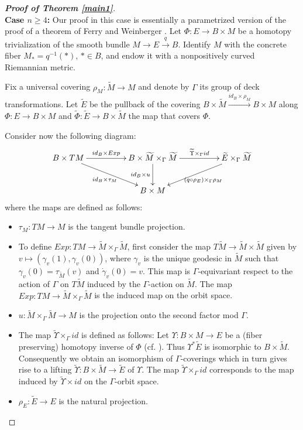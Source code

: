 \documentclass[onecolumn,notitlepage,11pt]{article}
\newcommand{\refer}[1]{\hyperref[#1]{\ref*{#1}}}%
\theoremstyle{definition}
\begin{document}
\begin{proof}[\textbf{Proof of Theorem \refer{main1}}]\ \\
\textbf{Case $n\geq 4$:} Our proof in this case is essentially
a parametrized version of the proof of a theorem of Ferry and Weinberger
\cite[Theorem 2]{FW91}. Let $\Phi:E\to B\times M$ be a homotopy trivialization of the
smooth bundle $M\to E\xrightarrow{q} B$. 
Identify $M$ with the concrete fiber $M_{\ast}=q^{-1}(\ast)$, 
$\ast\in B$, and endow it with a nonpositively curved Riemannian metric.

Fix a universal covering $\rho_M:\widetilde{M}\to M$ and 
denote by $\Gamma$ its
group of deck transformations. Let $\widetilde{E}$ be the pullback
of the covering 
$B\times\widetilde{M}\xrightarrow{id_B\times\rho_M}B\times M$ 
along $\Phi:E\to B\times M$ and 
$\widetilde{\Phi}:\widetilde{E}\to B\times\widetilde{M}$ the map
that covers $\Phi$. 

Consider now the 
following diagram:
\begin{equation}\label{diagram1}
\xymatrixcolsep{4pc}\xymatrix{
        B\times TM\ar[r]^-{id_B\times Exp}\ar[dr]_{id_B\times\tau_M}    
     & B\times\widetilde{M}\times_{\Gamma}\widetilde{M}\ar[d]_{id_B\times u}     
     \ar[r]^-{\widetilde{\Upsilon}\times_{\Gamma} id}      
     &\widetilde{E}\times_{\Gamma}\widetilde{M}\ar[dl]^-{(q\circ\rho_E)
     \times_{\Gamma}\rho_M}\\
     &B\times M&
}
\end{equation}
where the maps are defined as follows:
\begin{itemize}
\item $\tau_M:TM\to M$ is the tangent bundle projection.
\item To define
$Exp:TM\to \widetilde{M}\times_{\Gamma}\widetilde{M}$,
first consider the map $T\widetilde{M}\to\widetilde{M}\times\widetilde{M}$ 
given by $v\mapsto (\gamma_v(1),\gamma_v(0))$, where $\gamma_v$ is the unique
geodesic in $\widetilde{M}$ such that $\gamma_v(0)=\tau_{\widetilde{M}}(v)$
and $\dot{\gamma}_v(0)=v$. This map is $\Gamma$-equivariant respect to
the action of $\Gamma$ on $T\widetilde{M}$ induced by the $\Gamma$-action
on $\widetilde{M}$. The map
$Exp:TM\to\widetilde{M}\times_{\Gamma}\widetilde{M}$ is the induced map on
the orbit space.
\item $u:\widetilde{M}\times_{\Gamma}\widetilde{M}\to M$
is the projection onto the second
factor mod $\Gamma$.
\item The map $\widetilde{\Upsilon}\times_{\Gamma}id$ is defined as 
follows:
Let $\Upsilon:B\times M\to E$ be a (fiber preserving) 
homotopy inverse of $\Phi$ (cf. \cite{dold2}). Thus 
$\Upsilon^*\widetilde{E}$ is isomorphic to $B\times\widetilde{M}$.
Consequently we obtain an
isomorphism of $\Gamma$-coverings which in turn gives rise to a lifting
$\widetilde{\Upsilon}:B\times\widetilde{M}\to \widetilde{E}$ of
$\Upsilon$. The map 
$\widetilde{\Upsilon}\times_{\Gamma}id$ corresponds to the map induced by $\widetilde{\Upsilon}\times id$ on the $\Gamma$-orbit space.
\item $\rho_E:\widetilde{E}\to E$ is the natural projection.
\end{itemize}


\end{proof}
\end{document}
